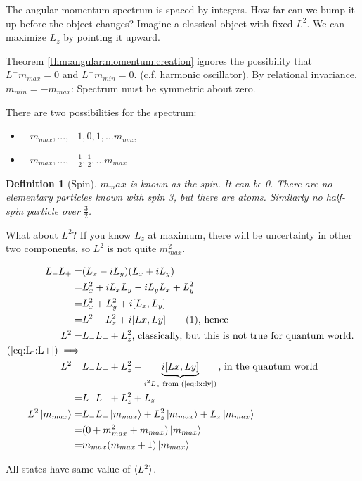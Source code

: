 \documentclass[]{article}
\newcommand\numberthis{\addtocounter{equation}{1}\tag{\theequation}}
\newtheorem{defn}[thm]{Definition}
\begin{document}
The angular momentum spectrum is spaced by integers. How far can we bump it up before the object changes? Imagine a classical object with fixed $L^2$. We can maximize $L_z$  by pointing it upward.

Theorem \ref{thm:angular:momentum:creation} ignores the possibility that $L^+m_{max}=0$ and $L^-m_{min}=0$. (c.f. harmonic oscillator). By relational invariance, $m_{min}=-m_{max}$: Spectrum must be symmetric about zero.

There are two possibilities for the spectrum:
\begin{itemize}
	\item $-m_{max},...,-1,0,1,...m_{max}$
	\item $-m_{max},...,-\frac{1}{2},\frac{1}{2},...m_{max}$
\end{itemize}

\begin{defn}[Spin]
	$m_max$ is known as the spin. It can be 0. There are no elementary particles known with spin 3, but there are atoms. Similarly no half-spin particle over $\frac{3}{2}$.
\end{defn}

What about $L^2$? If you know $L_z$ at maximum, there will be uncertainty in other two components, so $L^2$ is not quite $m_{max}^2$.

\begin{align*}
	L_- L_+ =& (L_x-iL_y)(L_x+iL_y)\\
	=& L_x^2 +i L_x L_y -i L_y L_x + L_y^2\\
	=& L_x^2 + L_y^2 + i[L_x,L_y]\\
	=& L^2 - L_z^2 + i[Lx,Ly] \numberthis \label{eq:L-:L+}\text{, hence}\\
	L^2 =& L_- L_+ + L_z^2 \text{, classically, but this is not true for quantum world. }\\
	(\ref{eq:L-:L+}) \implies& \\
	 L^2 =& L_- L_+ + L_z^2 -\underbrace{i[Lx,Ly]}_\text{$i^2L_z$ from (\ref{eq:lx:ly})}\text{, in the quantum world}\\
	 =& L_- L_+ + L_z^2 +L_z\\
	L^2 \ket{m_{max}}=& L_- L_+ \ket{m_{max}} + L_z^2 \ket{m_{max}} +L_z \ket{m_{max}}\\
	=& (0 +m_{max}^2 + m_{max})\ket{m_{max}} \\
	=& m_{max} (m_{max}+1)\ket{m_{max}}
\end{align*}

All states have same value of $\braket{L^2}$. 
\end{document}
